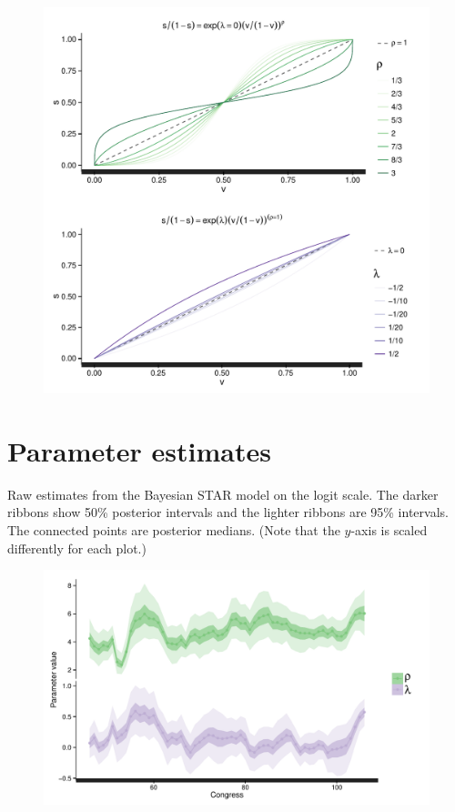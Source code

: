 \begin{figure}[h]
\centering
	\includegraphics[scale=0.8]{sections/figs/seats_votes}
\label{fig:seats_votes}
\end{figure}


\clearpage
\chapter[Parameter estimates]{Parameter estimates}\label{AppendixC}

Raw estimates from the Bayesian STAR model on the logit scale. The darker ribbons show 50\% posterior 
intervals and the lighter ribbons are 95\% intervals. The connected points are posterior medians. (Note that the $y$-axis is scaled differently for each plot.) 

\vspace{.5cm}

\begin{figure}[h]
\centering
	\includegraphics[scale=0.8]{sections/figs/lambda_rho}
\label{fig:lambda_rho}
\end{figure}


